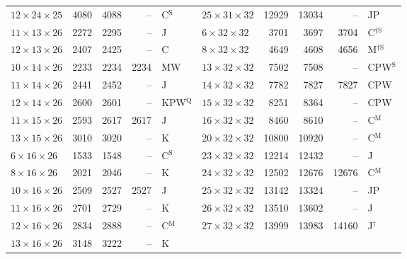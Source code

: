 \begin{longtable}{@{}lrrrl@{\hspace{6mm}}lrrrl@{}}
$12{\times}24{\times}25$ & 4080 & 4088 & -- & C$^{\mathrm{S}}$ & $25{\times}31{\times}32$ & 12929 & 13034 & -- & JP\\
$11{\times}13{\times}26$ & 2272 & 2295 & -- & J & $6{\times}32{\times}32$ & 3701 & 3697 & 3704 & C$^{\dagger\mathrm{S}}$\\
$12{\times}13{\times}26$ & 2407 & 2425 & -- & C & $8{\times}32{\times}32$ & 4649 & 4608 & 4656 & M$^{\dagger\mathrm{S}}$\\
$10{\times}14{\times}26$ & 2233 & 2234 & 2234 & MW & $13{\times}32{\times}32$ & 7502 & 7508 & -- & CPW$^{\mathrm{S}}$\\
$11{\times}14{\times}26$ & 2441 & 2452 & -- & J & $14{\times}32{\times}32$ & 7782 & 7827 & 7827 & CPW\\
$12{\times}14{\times}26$ & 2600 & 2601 & -- & KPW$^{\mathrm{Q}}$ & $15{\times}32{\times}32$ & 8251 & 8364 & -- & CPW\\
$11{\times}15{\times}26$ & 2593 & 2617 & 2617 & J & $16{\times}32{\times}32$ & 8460 & 8610 & -- & C$^{\mathrm{M}}$\\
$13{\times}15{\times}26$ & 3010 & 3020 & -- & K & $20{\times}32{\times}32$ & 10800 & 10920 & -- & C$^{\mathrm{M}}$\\
$6{\times}16{\times}26$ & 1533 & 1548 & -- & C$^{\mathrm{S}}$ & $23{\times}32{\times}32$ & 12214 & 12432 & -- & J\\
$8{\times}16{\times}26$ & 2021 & 2046 & -- & K & $24{\times}32{\times}32$ & 12502 & 12676 & 12676 & C$^{\mathrm{M}}$\\
$10{\times}16{\times}26$ & 2509 & 2527 & 2527 & J & $25{\times}32{\times}32$ & 13142 & 13324 & -- & JP\\
$11{\times}16{\times}26$ & 2701 & 2729 & -- & K & $26{\times}32{\times}32$ & 13510 & 13602 & -- & J\\
$12{\times}16{\times}26$ & 2834 & 2888 & -- & C$^{\mathrm{M}}$ & $27{\times}32{\times}32$ & 13999 & 13983 & 14160 & J$^{\dagger}$\\
$13{\times}16{\times}26$ & 3148 & 3222 & -- & K &  & & & & \\
\end{longtable}\endgroup

